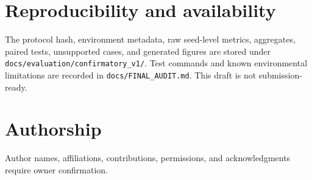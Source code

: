 \documentclass[11pt]{article}
\begin{document}
\section{Reproducibility and availability}
The protocol hash, environment metadata, raw seed-level metrics, aggregates,
paired tests, unsupported cases, and generated figures are stored under
\texttt{docs/evaluation/confirmatory\_v1/}. Test commands and known
environmental limitations are recorded in \texttt{docs/FINAL\_AUDIT.md}. This
draft is not submission-ready.

\section{Authorship}
Author names, affiliations, contributions, permissions, and acknowledgments
require owner confirmation.
\end{document}
